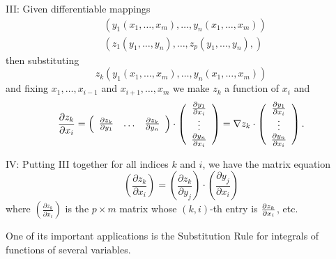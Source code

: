 \documentclass{ximera}
\begin{document}
\begin{theorem}
III: Given differentiable mappings%
\begin{align*}
& \left( y_{1}\left( x_{1},\ldots,x_{m}\right) ,\ldots,y_{n}\left(
x_{1},\ldots,x_{m}\right) \right) \\
& \left( z_{1}\left( y_{1},\ldots,y_{n}\right) ,\ldots,z_{p}\left(
y_{1},\ldots,y_{n}\right) ,\right)
\end{align*}
then substituting 
\begin{equation*}
z_{k}\left( y_{1}\left( x_{1},\ldots,x_{m}\right) ,\ldots,y_{n}\left(
x_{1},\ldots,x_{m}\right) \right) 
\end{equation*}
and fixing $x_{1},\ldots,x_{i-1}$ and $x_{i+1},\ldots,x_{m}$ we make $z_{k}$
a function of $x_{i}$ and%
\begin{equation*}
\frac{\partial z_{k}}{\partial x_{i}}=\left( 
\begin{array}{ccc}
\frac{\partial z_{k}}{\partial y_{1}} & \ldots & \frac{\partial z_{k}}{%
\partial y_{n}}%
\end{array}
\right) \cdot\left( 
\begin{array}{c}
\frac{\partial y_{1}}{\partial x_{i}} \\ 
\vdots \\ 
\frac{\partial y_{n}}{\partial x_{i}}%
\end{array}
\right) =\nabla z_{k}\cdot\left( 
\begin{array}{c}
\frac{\partial y_{1}}{\partial x_{i}} \\ 
\vdots \\ 
\frac{\partial y_{n}}{\partial x_{i}}%
\end{array}
\right) . 
\end{equation*}

IV: Putting III together for all indices $k$ and $i$, we have the matrix
equation%
\begin{equation}
\left( \frac{\partial z_{k}}{\partial x_{i}}\right) =\left( \frac{\partial
z_{k}}{\partial y_{j}}\right) \cdot\left( \frac{\partial y_{j}}{\partial
x_{i}}\right)   \label{ChR}
\end{equation}
where $\left( \frac{\partial z_{k}}{\partial x_{i}}\right) $ is the $p\times
m$ matrix whose $\left( k,i\right) $-th entry is $\frac{\partial z_{k}}{%
\partial x_{i}}$, etc.
\end{theorem}

One of its important applications is the Substitution Rule for integrals of
functions of several variables.
\end{document}
